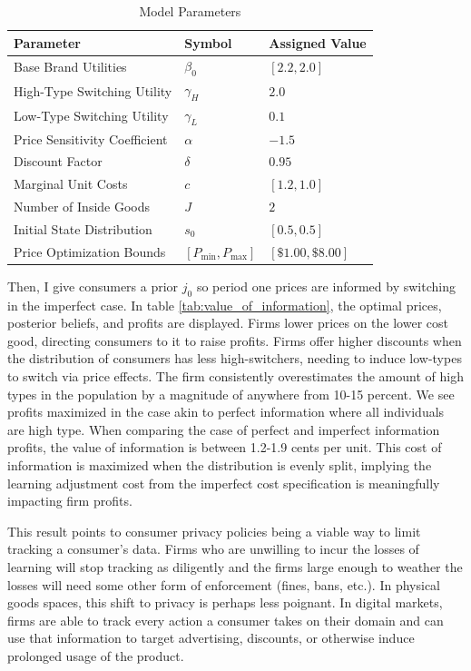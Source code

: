 \documentclass[11pt]{article}
\theoremstyle{definition}
\theoremstyle{remark}
\begin{document}
\begin{table}[htbp]
\centering
\caption*{Model Parameters}
\renewcommand{\arraystretch}{1.2}
\begin{tabular}{lll}
\toprule
\textbf{Parameter} & \textbf{Symbol} & \textbf{Assigned Value} \\
\midrule
Base Brand Utilities & $\beta_0$ & $[2.2, 2.0]$ \\
High-Type Switching Utility & $\gamma_H$ & $2.0$ \\
Low-Type Switching Utility & $\gamma_L$ & $0.1$ \\
Price Sensitivity Coefficient & $\alpha$ & $-1.5$ \\
Discount Factor & $\delta$ & $0.95$ \\
Marginal Unit Costs & $c$ & $[1.2, 1.0]$ \\
Number of Inside Goods & $J$ & $2$ \\
Initial State Distribution & $s_0$ & $[0.5, 0.5]$ \\
Price Optimization Bounds & $[P_{\min}, P_{\max}]$ & $[\$1.00, \$8.00]$ \\
\bottomrule
\end{tabular}
\end{table}
\newpage

Then, I give consumers a prior $j_0$ so period one prices are informed by switching in the imperfect case. In table \ref{tab:value_of_information}, the optimal prices, posterior beliefs, and profits are displayed. Firms lower prices on the lower cost good, directing consumers to it to raise profits. Firms offer higher discounts when the distribution of consumers has less high-switchers, needing to induce low-types to switch via price effects. The firm consistently overestimates the amount of high types in the population by a magnitude of anywhere from 10-15 percent. We see profits maximized in the case akin to perfect information where all individuals are high type. When comparing the case of perfect and imperfect information profits, the value of information is between 1.2-1.9 cents per unit. This cost of information is maximized when the distribution is evenly split, implying the learning adjustment cost from the imperfect cost specification is meaningfully impacting firm profits.

This result points to consumer privacy policies being a viable way to limit tracking a consumer's data. Firms who are unwilling to incur the losses of learning will stop tracking as diligently and the firms large enough to weather the losses will need some other form of enforcement (fines, bans, etc.). In physical goods spaces, this shift to privacy is perhaps less poignant. In digital markets, firms are able to track every action a consumer takes on their domain and can use that information to target advertising, discounts, or otherwise induce prolonged usage of the product.  
\end{document}
